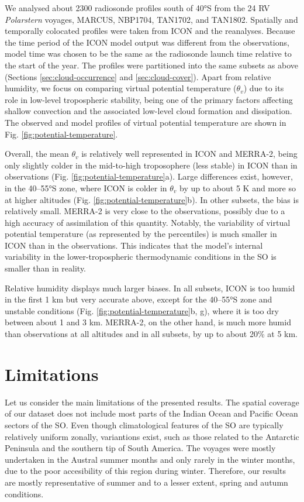 \documentclass[12pt,a4paper]{article}
\begin{document}
We analysed about 2300 radiosonde profiles south of 40°S from the 24 RV
\emph{Polarstern} voyages, MARCUS, NBP1704, TAN1702, and TAN1802. Spatially and
temporally colocated profiles were taken from ICON and the reanalyses. Because
the time period of the ICON model output was different from the observations,
model time was chosen to be the same as the radiosonde launch time relative to
the start of the year. The profiles were partitioned into the same subsets as
above (Sections \ref{sec:cloud-occurrence} and \ref{sec:cloud-cover}).  Apart
from relative humidity, we focus on comparing virtual potential temperature
($\theta_v$) due to its role in low-level tropospheric stability, being one of
the primary factors affecting shallow convection and the associated low-level
cloud formation and dissipation. The observed and model profiles of virtual
potential temperature are shown in Fig. \ref{fig:potential-temperature}.

Overall, the mean $\theta_v$ is relatively well represented in ICON and
MERRA-2, being only slightly colder in the mid-to-high troposophere (less
stable) in ICON than in observations (Fig. \ref{fig:potential-temperature}a).
Large differences exist, however, in the 40--55°S zone, where ICON is colder in
$\theta_v$ by up to about 5 K and more so at higher altitudes (Fig.
\ref{fig:potential-temperature}b). In other subsets, the bias is relatively
small. MERRA-2 is very close to the observations, possibly due to a high
accuracy of assimilation of this quantity. Notably, the variability of virtual
potential temperature (as represented by the percentiles) is much smaller in
ICON than in the observations. This indicates that the model's internal
variability in the lower-tropospheric thermodynamic conditions in the SO is
smaller than in reality.

Relative humidity displays much larger biases. In all subsets, ICON is too
humid in the first 1 km but very accurate above, except for the 40--55°S zone
and unstable conditions (Fig. \ref{fig:potential-temperature}b, g),  where it
is too dry between about 1 and 3 km. MERRA-2, on the other hand, is much more
humid than observations at all altitudes and in all subsets, by up to about
20\% at 5 km.

\section{Limitations}

Let us consider the main limitations of the presented results. The spatial
coverage of our dataset does not include most parts of the Indian Ocean and
Pacific Ocean sectors of the SO. Even though climatological features of the SO
are typically relatively uniform zonally, variantions exist, such as those
related to the Antarctic Peninsula and the southern tip of South America. The
voyages were mostly undertaken in the Austral summer months and only rarely in
the winter months, due to the poor accesibility of this region during winter.
Therefore, our results are mostly representative of summer and to a lesser
extent, spring and autumn conditions.
\end{document}

